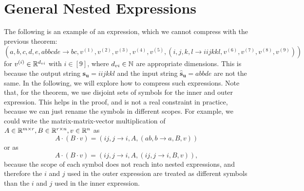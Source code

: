 \section{General Nested Expressions}

The following is an example of an expression, which we cannot compress with the previous theorem:
$$(a,b,c,d,e,abbcde \rightarrow bc, v^{(1)}, v^{(2)}, v^{(3)}, v^{(4)}, v^{(5)}, (
    i,j,k,l \rightarrow iijkkl, v^{(6)}, v^{(7)}, v^{(8)}, v^{(9)}
    ))$$
for $v^{(i)} \in \mathbb{R}^{d_{vi}}$ with $i \in [9]$, where $d_{vi} \in \mathbb{N}$ are appropriate dimensions.
This is because the output string $\bm{s_u} = iijkkl$ and the input string $\bm{\hat{s}_u} = abbde$ are not the same.
In the following, we will explore how to compress such expressions.
Note that, for the theorem, we use disjoint sets of symbols for the inner and outer expression.
This helps in the proof, and is not a real constraint in practice,
because we can just rename the symbols in different scopes.
For example, we could write the matrix-matrix-vector multiplication of $A \in \mathbb{R}^{m \times r}, B \in \mathbb{R}^{r \times n}, v \in \mathbb{R}^n$ as
$$A \cdot (B \cdot v) = (ij, j \rightarrow i, A, (ab, b \rightarrow a, B, v))$$
or as
$$A \cdot (B \cdot v) = (ij, j \rightarrow i, A, (ij, j \rightarrow i, B, v)),$$
because the scope of each symbol does not reach into nested expressions,
and therefore the $i$ and $j$ used in the outer expression are treated as different symbols than the $i$ and $j$ used in the inner expression.

